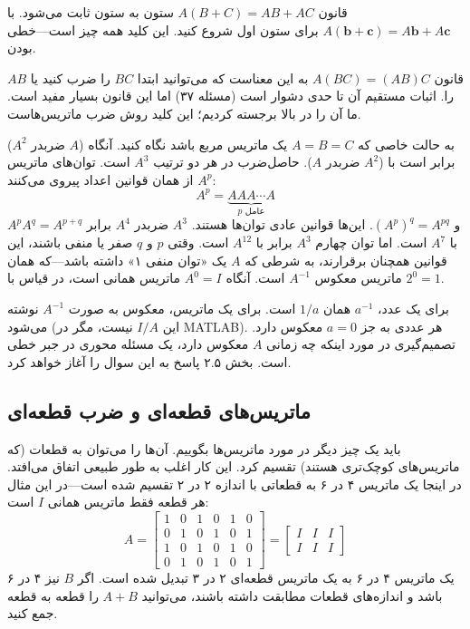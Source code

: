 \documentclass[12pt, a4paper]{book}
\begin{document}
	قانون $A(B+C)=AB+AC$ ستون به ستون ثابت می‌شود. با $A(\mathbf{b}+\mathbf{c}) = A\mathbf{b}+A\mathbf{c}$ برای ستون اول شروع کنید. این کلید همه چیز است—خطی بودن.
	
	قانون $A(BC)=(AB)C$ به این معناست که می‌توانید ابتدا $BC$ را ضرب کنید یا $AB$ را. اثبات مستقیم آن تا حدی دشوار است (مسئله ۳۷) اما این قانون بسیار مفید است. ما آن را در بالا برجسته کردیم؛ این کلید روش ضرب ماتریس‌هاست.
	
	به حالت خاصی که $A=B=C$ یک ماتریس مربع باشد نگاه کنید. آنگاه ($A$ ضربدر $A^2$) برابر است با ($A^2$ ضربدر $A$). حاصل‌ضرب در هر دو ترتیب $A^3$ است. توان‌های ماتریس $A^p$ از همان قوانین اعداد پیروی می‌کنند:
	\[ A^p = \underbrace{AAA \cdots A}_{p \text{ عامل}} \]
	$A^p A^q = A^{p+q}$ و $(A^p)^q = A^{pq}$.
	این‌ها قوانین عادی توان‌ها هستند. $A^3$ ضربدر $A^4$ برابر با $A^7$ است. اما توان چهارم $A^3$ برابر با $A^{12}$ است. وقتی $p$ و $q$ صفر یا منفی باشند، این قوانین همچنان برقرارند، به شرطی که $A$ یک «توان منفی ۱» داشته باشد—که همان ماتریس معکوس $A^{-1}$ است. آنگاه $A^0=I$ ماتریس همانی است، در قیاس با $2^0=1$.
	
	برای یک عدد، $a^{-1}$ همان $1/a$ است. برای یک ماتریس، معکوس به صورت $A^{-1}$ نوشته می‌شود (این $I/A$ نیست، مگر در MATLAB). هر عددی به جز $a=0$ معکوس دارد. تصمیم‌گیری در مورد اینکه چه زمانی $A$ معکوس دارد، یک مسئله محوری در جبر خطی است. بخش ۲.۵ پاسخ به این سوال را آغاز خواهد کرد.
	
	\subsection*{ماتریس‌های قطعه‌ای و ضرب قطعه‌ای}
	باید یک چیز دیگر در مورد ماتریس‌ها بگوییم. آن‌ها را می‌توان به قطعات (که ماتریس‌های کوچک‌تری هستند) تقسیم کرد. این کار اغلب به طور طبیعی اتفاق می‌افتد. در اینجا یک ماتریس ۴ در ۶ به قطعاتی با اندازه ۲ در ۲ تقسیم شده است—در این مثال هر قطعه فقط ماتریس همانی $I$ است:
	\[
	A = \left[ \begin{array}{cc|cc|cc}
		1 & 0 & 1 & 0 & 1 & 0 \\
		0 & 1 & 0 & 1 & 0 & 1 \\ \hline
		1 & 0 & 1 & 0 & 1 & 0 \\
		0 & 1 & 0 & 1 & 0 & 1
	\end{array} \right] =
	\begin{bmatrix} I & I & I \\ I & I & I \end{bmatrix}
	\]
	یک ماتریس ۴ در ۶ به یک ماتریس قطعه‌ای ۲ در ۳ تبدیل شده است. اگر $B$ نیز ۴ در ۶ باشد و اندازه‌های قطعات مطابقت داشته باشند، می‌توانید $A+B$ را قطعه به قطعه جمع کنید.
	
\end{document}
